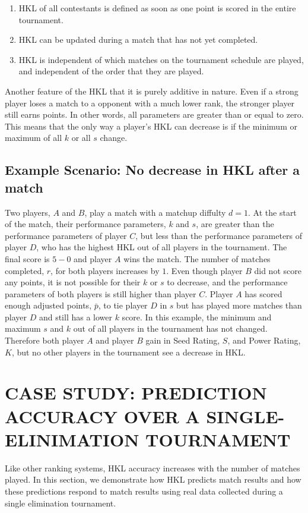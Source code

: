 \documentclass[letterpaper, 10 pt, conference]{ieeeconf}  %
\begin{document}
\begin{enumerate}
        \item HKL of all contestants is defined as soon as one point is scored in the entire tournament.
        \item HKL can be updated during a match that has not yet completed.
        \item HKL is independent of which matches on the tournament schedule are played, and independent of the order that they are played.
\end{enumerate}

Another feature of the HKL that it is purely additive in nature.
Even if a strong player loses a match to a opponent with a much lower rank, the stronger player still earns points. 
In other words, all parameters are greater than or equal to zero.
This means that the only way a player's HKL can decrease is if the minimum or maximum of all $k$ or all $s$ change. 

\subsection{Example Scenario: No decrease in HKL after a match}
Two players, $A$ and $B$, play a match with a matchup diffulty $d=1$.
At the start of the match, their performance parameters, $k$ and $s$, are greater than the performance parameters of player $C$, but less than the performance parameters of player $D$, who has the highest HKL out of all players in the tournament.
The final score is $5-0$ and player $A$ wins the match.
The number of matches completed, $r$, for both players increases by $1$.
Even though player $B$ did not score any points, it is not possible for their $k$ or $s$ to decrease, and the performance parameters of both players is still higher than player $C$.
Player $A$ has scored enough adjusted points, $\bar{p}$, to tie player $D$ in $s$ but has played more matches than player $D$ and still has a lower $k$ score.
In this example, the minimum and maximum $s$ and $k$ out of all players in the tournament has not changed. 
Therefore both player $A$ and player $B$ gain in Seed Rating, $S$, and Power Rating, $K$, but no other players in the tournament see a decrease in HKL.


\section{CASE STUDY: PREDICTION ACCURACY OVER A SINGLE-ELINIMATION TOURNAMENT}
Like other ranking systems, HKL accuracy increases with the number of matches played.
In this section, we demonstrate how HKL predicts match results and how these predictions respond to match results using real data collected during a single elimination tournament.
\end{document}
